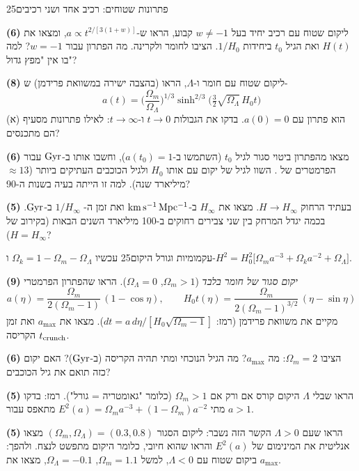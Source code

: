 \documentclass[11pt,a4paper]{article}
\begin{document}
\begin{question}{פתרונות שטוחים: רכיב אחד ושני רכיבים}{25}
\begin{parts}
\item \textbf{(6)} ליקום שטוח עם רכיב יחיד בעל $w\neq-1$ קבוע, הראו ש-$a\propto t^{2/[3(1+w)]}$, ומצאו את $H(t)$ ואת הגיל $t_0$ ביחידות $1/H_0$. הציבו לחומר ולקרינה. מה הפתרון עבור $w=-1$? למה בו אין "מפץ גדול"?
\item \textbf{(8)} ליקום שטוח עם חומר ו-$\Lambda$, הראו (בהצבה ישירה במשוואת פרידמן) ש-
\[a(t)=\Big(\frac{\Omega_m}{\Omega_\Lambda}\Big)^{1/3}\sinh^{2/3}\!\Big(\tfrac32\sqrt{\Omega_\Lambda}\,H_0t\Big)\]
הוא פתרון עם $a(0)=0$. בדקו את הגבולות $t\to0$ ו-$t\to\infty$: לאילו פתרונות מסעיף (א) הם מתכנסים?
\item \textbf{(6)} מצאו מהפתרון ביטוי סגור לגיל $t_0$ (השתמשו ב-$a(t_0)=1$), וחשבו אותו ב-$\mathrm{Gyr}$ עבור הפרמטרים של . השוו לגיל של יקום  עם אותו $H_0$ ולגיל הכוכבים העתיקים ביותר ($\approx13$ מיליארד שנה). למה זו הייתה בעיה בשנות ה-90?
\item \textbf{(5)} בעתיד הרחוק $H\to H_\infty$. מצאו את $H_\infty$ ב-$\mathrm{km\,s^{-1}\,Mpc^{-1}}$ ואת זמן ה- $1/H_\infty$ ב-$\mathrm{Gyr}$. בכמה יגדל המרחק בין שני צבירים רחוקים ב-100 מיליארד השנים הבאות (בקירוב של $H=H_\infty$)?
\end{parts}
\end{question}

\begin{question}{עקמומיות וגורל היקום}{25}
עכשיו $\Omega_k=1-\Omega_m-\Omega_\Lambda$ ו-$H^2=H_0^2\big[\Omega_ma^{-3}+\Omega_ka^{-2}+\Omega_\Lambda\big]$.
\begin{parts}
\item \textbf{(9)} \emph{יקום סגור של חומר בלבד} ($\Omega_m>1$, $\Omega_\Lambda=0$). הראו שהפתרון הפרמטרי
\[a(\eta)=\frac{\Omega_m}{2(\Omega_m-1)}\,(1-\cos\eta),\qquad H_0t(\eta)=\frac{\Omega_m}{2(\Omega_m-1)^{3/2}}\,(\eta-\sin\eta)\]
מקיים את משוואת פרידמן (רמז: $dt=a\,d\eta/[H_0\sqrt{\Omega_m-1}]$). מצאו את $a_{\max}$ ואת זמן הקריסה $t_{\rm crunch}$.
\item \textbf{(6)} הציבו $\Omega_m=2$: מה $a_{\max}$? מה הגיל הנוכחי ומתי תהיה הקריסה (ב-$\mathrm{Gyr}$)? האם יקום כזה תואם את גיל הכוכבים?
\item \textbf{(5)} הראו שבלי $\Lambda$ היקום קורס אם ורק אם $\Omega_m>1$ (כלומר "גאומטריה = גורל"). רמז: בדקו מתי $E^2(a)=\Omega_ma^{-3}+(1-\Omega_m)a^{-2}$ מתאפס עבור $a>1$.
\item \textbf{(5)} הראו שעם $\Lambda>0$ הקשר הזה נשבר: ליקום הסגור $(\Omega_m,\Omega_\Lambda)=(0.3,0.8)$ מצאו אנליטית את המינימום של $E^2(a)$ והראו שהוא חיובי, כלומר היקום מתפשט לנצח. ולהפך: ביקום שטוח עם $\Lambda<0$, למשל $\Omega_m=1.1$, $\Omega_\Lambda=-0.1$, מצאו את $a_{\max}$.
\end{parts}
\end{question}
\end{document}
